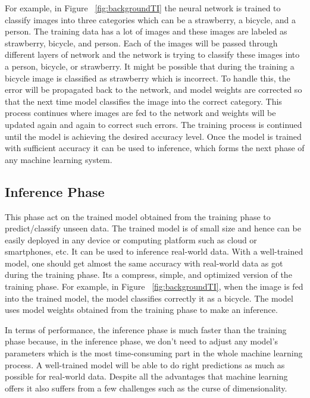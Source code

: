 For example, in Figure ~\ref{fig:backgroundTI} the neural network is trained to classify images into three categories which can be a strawberry, a bicycle, and a person. The training data has a lot of images and these images are labeled as strawberry, bicycle, and person. Each of the images will be passed through different layers of network and the network is trying to classify these images into a person, bicycle, or strawberry. It might be possible that during the training a bicycle image is classified as strawberry which is incorrect. To handle this, the error will be propagated back to the network, and model weights are corrected so that the next time model classifies the image into the correct category. This process continues where images are fed to the network and weights will be updated again and again to correct such errors. The training process is continued until the model is achieving the desired accuracy level. Once the model is trained with sufficient accuracy it can be used to inference, which forms the next phase of any machine learning system.
 

\subsection{Inference Phase}
This phase act on the trained model obtained from the training phase to predict/classify unseen data. The trained model is of small size and hence can be easily deployed in any device or computing platform such as cloud or smartphones, etc. It can be used to inference real-world data. With a well-trained model, one should get almost the same accuracy with real-world data as got during the training phase. Its a compress, simple, and optimized version of the training phase. For example, in Figure ~\ref{fig:backgroundTI}, when the image is fed into the trained model, the model classifies correctly it as a bicycle. The model uses model weights obtained from the training phase to make an inference.

In terms of performance, the inference phase is much faster than the training phase because, in the inference phase, we don't need to adjust any model's parameters which is the most time-consuming part in the whole machine learning process. A well-trained model will be able to do right predictions as much as possible for real-world data. Despite all the advantages that machine learning offers it also suffers from a few challenges such as the curse of dimensionality.

